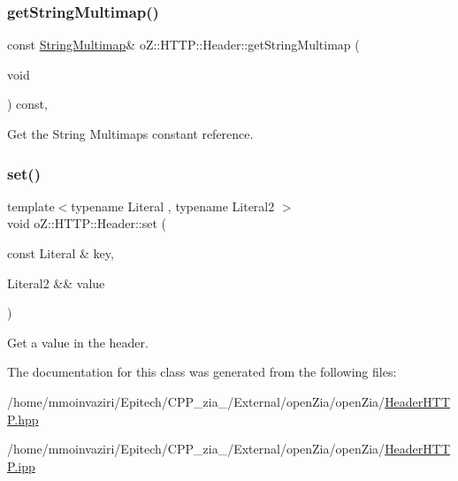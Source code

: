 \subsubsection{\texorpdfstring{getStringMultimap()}{getStringMultimap()}\hspace{0.1cm}{\footnotesize\ttfamily [2/2]}}
{\footnotesize\ttfamily const \mbox{\hyperlink{namespaceo_z_1_1_h_t_t_p_a339aac279d709cfa16148ad073500fc1}{String\+Multimap}}\& o\+Z\+::\+H\+T\+T\+P\+::\+Header\+::get\+String\+Multimap (\begin{DoxyParamCaption}\item[{void}]{ }\end{DoxyParamCaption}) const\hspace{0.3cm}{\ttfamily [inline]}, {\ttfamily [noexcept]}}



Get the String Multimap\textquotesingle{}s constant reference. 

\mbox{\label{classo_z_1_1_h_t_t_p_1_1_header_a3063660c3eb22844296e83807b8a62e1}} 
\subsubsection{\texorpdfstring{set()}{set()}}
{\footnotesize\ttfamily template$<$typename Literal , typename Literal2 $>$ \\
void o\+Z\+::\+H\+T\+T\+P\+::\+Header\+::set (\begin{DoxyParamCaption}\item[{const Literal \&}]{key,  }\item[{Literal2 \&\&}]{value }\end{DoxyParamCaption})\hspace{0.3cm}{\ttfamily [inline]}}



Get a value in the header. 



The documentation for this class was generated from the following files\+:\begin{DoxyCompactItemize}
\item 
/home/mmoinvaziri/\+Epitech/\+C\+P\+P\+\_\+zia\+\_/\+External/open\+Zia/open\+Zia/\mbox{\hyperlink{_header_h_t_t_p_8hpp}{Header\+H\+T\+T\+P.\+hpp}}\item 
/home/mmoinvaziri/\+Epitech/\+C\+P\+P\+\_\+zia\+\_/\+External/open\+Zia/open\+Zia/\mbox{\hyperlink{_header_h_t_t_p_8ipp}{Header\+H\+T\+T\+P.\+ipp}}\end{DoxyCompactItemize}
